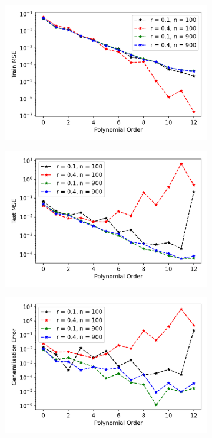 \begin{figure}[htb]
\centering
\begin{subfigure}{.5\textwidth}
  \centering
  \includegraphics[width=.9\linewidth]{Images/ols2.png}
  \caption{}
  \label{fig:ols1}
\end{subfigure}%
\begin{subfigure}{.5\textwidth}
  \centering
  \includegraphics[width=.9\linewidth]{Images/ols1.png}
  \caption{}
  \label{fig:ols2}
\end{subfigure}
\begin{subfigure}{.5\textwidth}
  \centering
  \includegraphics[width=.9\linewidth]{Images/ols3.png}

\end{subfigure}
\end{figure}
